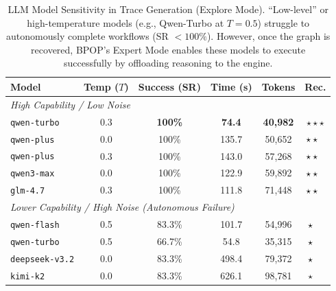 \documentclass{article}
\theoremstyle{plain}
\theoremstyle{definition}
\theoremstyle{remark}
\begin{document}
\begin{table}[h]
\centering
\caption{LLM Model Sensitivity in Trace Generation (Explore Mode). ``Low-level'' or high-temperature models (e.g., Qwen-Turbo at $T=0.5$) struggle to autonomously complete workflows (SR $<100\%$). However, once the graph is recovered, BPOP's Expert Mode enables these models to execute successfully by offloading reasoning to the engine.}
\label{tab:model_sensitivity}
\small
\setlength{\tabcolsep}{4pt}
\begin{tabular}{l c c c c c}
\toprule
\textbf{Model} & \textbf{Temp ($T$)} & \textbf{Success (SR)} & \textbf{Time (s)} & \textbf{Tokens} & \textbf{Rec.} \\
\midrule
\multicolumn{6}{l}{\textit{High Capability / Low Noise}} \\
\texttt{qwen-turbo} & 0.3 & \textbf{100\%} & \textbf{74.4} & \textbf{40,982} & $\star\star\star$ \\
\texttt{qwen-plus} & 0.0 & 100\% & 135.7 & 50,652 & $\star\star\hphantom{\star}$ \\
\texttt{qwen-plus} & 0.3 & 100\% & 143.0 & 57,268 & $\star\star\hphantom{\star}$ \\
\texttt{qwen3-max} & 0.0 & 100\% & 122.9 & 59,892 & $\star\star\hphantom{\star}$ \\
\texttt{glm-4.7} & 0.3 & 100\% & 111.8 & 71,448 & $\star\star\hphantom{\star}$ \\
\midrule
\multicolumn{6}{l}{\textit{Lower Capability / High Noise (Autonomous Failure)}} \\
\texttt{qwen-flash} & 0.5 & 83.3\% & 101.7 & 54,996 & $\star\hphantom{\star}\hphantom{\star}$ \\
\texttt{qwen-turbo} & 0.5 & 66.7\% & 54.8 & 35,315 & $\star\hphantom{\star}\hphantom{\star}$ \\
\texttt{deepseek-v3.2} & 0.0 & 83.3\% & 498.4 & 79,372 & $\star\hphantom{\star}\hphantom{\star}$ \\
\texttt{kimi-k2} & 0.0 & 83.3\% & 626.1 & 98,781 & $\star\hphantom{\star}\hphantom{\star}$ \\
\bottomrule
\end{tabular}
\end{table}
\end{document}
